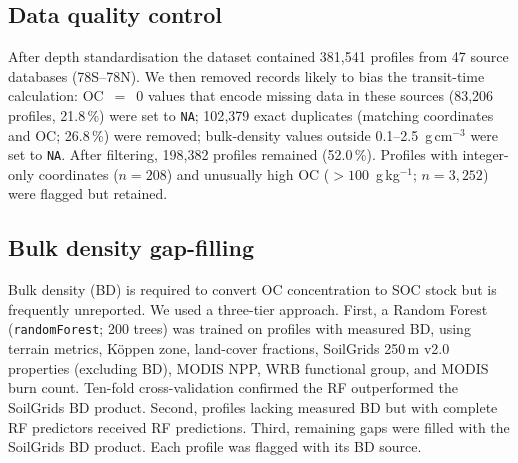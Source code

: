 \documentclass[12pt, a4paper]{article}
\begin{document}
\subsection{Data quality control}
After depth standardisation the dataset contained 381{,}541 profiles from 47 source
databases (78\textdegree S--78\textdegree N). We then removed records likely to bias the
transit-time calculation: OC~$=$~0 values that encode missing data in these sources
(83{,}206 profiles, 21.8\,\%) were set to \texttt{NA}; 102{,}379 exact duplicates
(matching coordinates and OC; 26.8\,\%) were removed; bulk-density values outside
0.1--2.5~g\,cm$^{-3}$ were set to \texttt{NA}. After filtering, 198{,}382 profiles
remained (52.0\,\%). Profiles with integer-only coordinates ($n=208$) and unusually
high OC ($>100$~g\,kg$^{-1}$; $n=3{,}252$) were flagged but retained.

\subsection{Bulk density gap-filling}
Bulk density (BD) is required to convert OC concentration to SOC stock but is
frequently unreported. We used a three-tier approach. First, a Random Forest
(\texttt{randomForest}; 200 trees) was trained on profiles with measured BD, using
terrain metrics, K\"oppen zone, land-cover fractions, SoilGrids 250\,m v2.0 properties
\citep{Poggio2021} (excluding BD), MODIS NPP, WRB functional group, and MODIS burn
count. Ten-fold cross-validation confirmed the RF outperformed the SoilGrids BD
product. Second, profiles lacking measured BD but with complete RF predictors received
RF predictions. Third, remaining gaps were filled with the SoilGrids BD product. Each
profile was flagged with its BD source.
\end{document}
